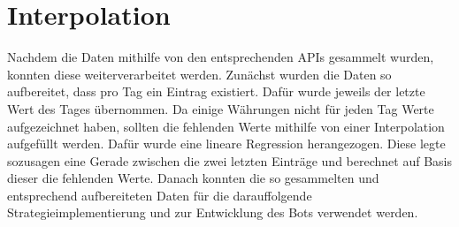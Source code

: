 \section{Interpolation}

Nachdem die Daten mithilfe von den entsprechenden APIs gesammelt wurden, konnten diese weiterverarbeitet werden. Zunächst wurden die Daten so aufbereitet, dass pro Tag ein Eintrag existiert. Dafür wurde jeweils der letzte Wert des Tages übernommen. Da einige Währungen nicht für jeden Tag Werte aufgezeichnet haben, sollten die fehlenden Werte mithilfe von einer Interpolation aufgefüllt werden. Dafür wurde eine lineare Regression herangezogen. Diese legte sozusagen eine Gerade zwischen die zwei letzten Einträge und berechnet auf Basis dieser die fehlenden Werte.  Danach konnten die so gesammelten und entsprechend aufbereiteten Daten für die darauffolgende Strategieimplementierung und zur Entwicklung des Bots verwendet werden.